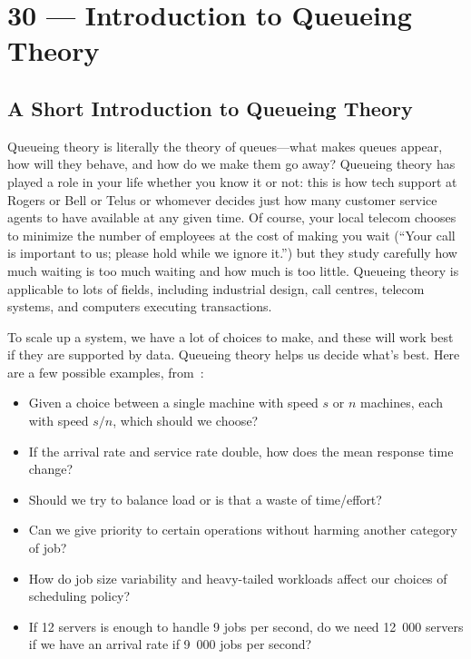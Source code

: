 \documentclass[a4paper]{report}
\begin{document}
\chapter*{30 --- Introduction to Queueing Theory}


\section*{A Short Introduction to Queueing Theory}

Queueing theory is literally the theory of queues---what makes queues appear, how will they behave, and how do we make them go away? Queueing theory has played a role in your life whether you know it or not: this is how tech support at Rogers or Bell or Telus or whomever decides just how many customer service agents to have available at any given time. Of course, your local telecom chooses to minimize the number of employees at the cost of making you wait (``Your call is important to us; please hold while we ignore it.'') but they study carefully how much waiting is too much waiting and how much is too little. Queueing theory is applicable to lots of fields, including industrial design, call centres, telecom systems, and computers executing transactions. 

To scale up a system, we have a lot of choices to make, and these will work best if they are supported by data. Queueing theory helps us decide what's best. Here are a few possible examples, from~\cite{pmd}:

\begin{itemize}
 \item Given a choice between a single machine with speed $s$ or $n$ machines, each with speed $s/n$, which should we choose?
 \item If the arrival rate and service rate double, how does the mean response time change?
 \item Should we try to balance load or is that a waste of time/effort?
 \item Can we give priority to certain operations without harming another category of job?
 \item How do job size variability and heavy-tailed workloads affect our choices of scheduling policy?
 \item If 12 servers is enough to handle 9 jobs per second, do we need 12~000 servers if we have an arrival rate if 9~000 jobs per second?
\end{itemize}
\end{document}
